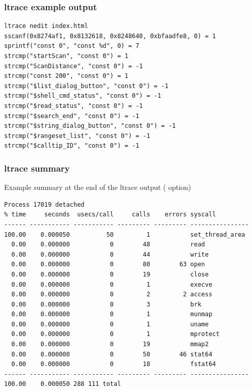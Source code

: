 \begin{frame}[fragile]
  \frametitle{ltrace example output}
  \small
  \begin{block}{}
\begin{verbatim}
ltrace nedit index.html
sscanf(0x8274af1, 0x8132618, 0x8248640, 0xbfaadfe8, 0) = 1
sprintf("const 0", "const %d", 0) = 7
strcmp("startScan", "const 0") = 1
strcmp("ScanDistance", "const 0") = -1
strcmp("const 200", "const 0") = 1
strcmp("$list_dialog_button", "const 0") = -1
strcmp("$shell_cmd_status", "const 0") = -1
strcmp("$read_status", "const 0") = -1
strcmp("$search_end", "const 0") = -1
strcmp("$string_dialog_button", "const 0") = -1
strcmp("$rangeset_list", "const 0") = -1
strcmp("$calltip_ID", "const 0") = -1
\end{verbatim}
\end{block}
\end{frame}

\begin{frame}[fragile]
  \frametitle{ltrace summary}
  Example summary at the end of the ltrace output ( option)
  \scriptsize
  \begin{block}{}
\begin{verbatim}
Process 17019 detached
% time     seconds  usecs/call     calls    errors syscall
------ ----------- ----------- --------- --------- ----------------
100.00    0.000050          50         1           set_thread_area
  0.00    0.000000           0        48           read
  0.00    0.000000           0        44           write
  0.00    0.000000           0        80        63 open
  0.00    0.000000           0        19           close
  0.00    0.000000           0         1           execve
  0.00    0.000000           0         2         2 access
  0.00    0.000000           0         3           brk
  0.00    0.000000           0         1           munmap
  0.00    0.000000           0         1           uname
  0.00    0.000000           0         1           mprotect
  0.00    0.000000           0        19           mmap2
  0.00    0.000000           0        50        46 stat64
  0.00    0.000000           0        18           fstat64
------ ----------- ----------- --------- --------- ----------------
100.00    0.000050 288 111 total
\end{verbatim}
  \end{block}
\end{frame}

